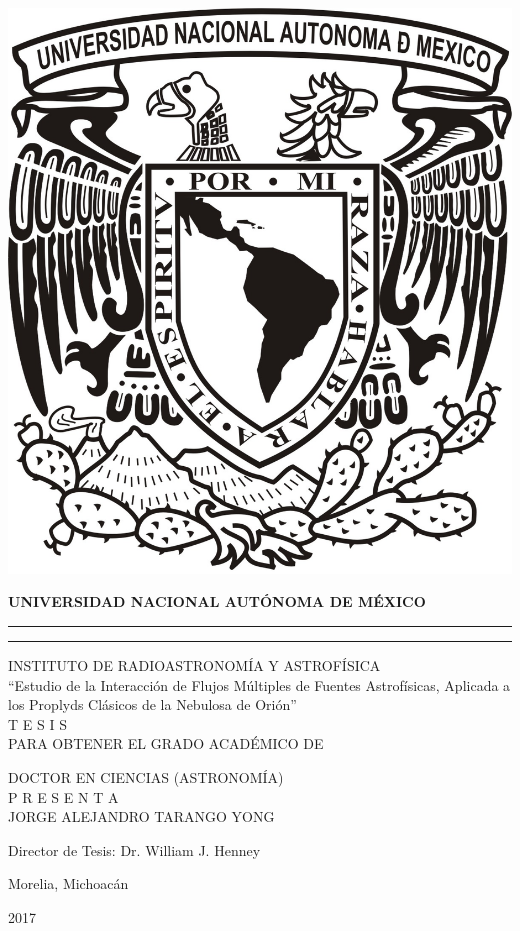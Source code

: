 \begin{center}
\includegraphics[width=0.2\linewidth]{./Figures/logoUNAM}

\large
\textbf{UNIVERSIDAD NACIONAL AUTÓNOMA DE MÉXICO}

\rule{\linewidth}{0.1pt}

\rule[3mm]{0.7\linewidth}{1pt}


INSTITUTO DE RADIOASTRONOMÍA Y ASTROFÍSICA
\\[3\baselineskip]
``Estudio de la Interacción de Flujos Múltiples de Fuentes Astrofísicas, Aplicada
a los Proplyds Clásicos de la Nebulosa de Orión''
\\[2\baselineskip]

T E S I S
\\[2\baselineskip]
PARA OBTENER EL GRADO ACADÉMICO DE

DOCTOR EN CIENCIAS (ASTRONOMÍA)
\\[2\baselineskip]

P R E S E N T A
\\[2\baselineskip]
JORGE ALEJANDRO TARANGO YONG

Director de Tesis: Dr. William J. Henney
\\[2\baselineskip]
\normalsize
\end{center}
\begin{flushright}
Morelia, Michoacán

2017

\end{flushright}
